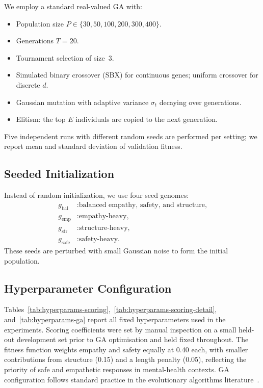 \documentclass[mathematics,article,xetex,moreauthors]{Definitions/mdpi}
\begin{document}
We employ a standard real-valued GA with:
\begin{itemize}
  \item Population size \(P \in \{30, 50, 100, 200, 300, 400\}\).
  \item Generations $T = 20$.
  \item Tournament selection of size~3.
  \item Simulated binary crossover (SBX) for continuous genes; uniform
        crossover for discrete \(d\).
  \item Gaussian mutation with adaptive variance \(\sigma_t\) decaying over
        generations.
  \item Elitism: the top \(E\) individuals are copied to the next generation.
\end{itemize}
Five independent runs with different random seeds are performed per setting;
we report mean and standard deviation of validation fitness.

\subsection{Seeded Initialization}

Instead of random initialization, we use four seed genomes:
\begin{align}
  g_{\mathrm{bal}}  &: \text{balanced empathy, safety, and structure,} \\
  g_{\mathrm{emp}}  &: \text{empathy-heavy,} \\
  g_{\mathrm{str}}  &: \text{structure-heavy,} \\
  g_{\mathrm{safe}} &: \text{safety-heavy.}
\end{align}
These seeds are perturbed with small Gaussian noise to form the initial
population.

\subsection{Hyperparameter Configuration}
\label{sec:hyperparams}

Tables~\ref{tab:hyperparams-scoring},~\ref{tab:hyperparams-scoring-detail},
and~\ref{tab:hyperparams-ga} report all
fixed hyperparameters used in the experiments. Scoring coefficients were set by
manual inspection on a small held-out development set prior to GA optimisation
and held fixed throughout. The fitness function weights empathy and safety
equally at 0.40 each, with smaller contributions from structure (0.15) and a
length penalty (0.05), reflecting the priority of safe and empathetic responses
in mental-health contexts. GA configuration follows standard practice in the
evolutionary algorithms literature~\cite{back1997evolutionary}.
\end{document}
